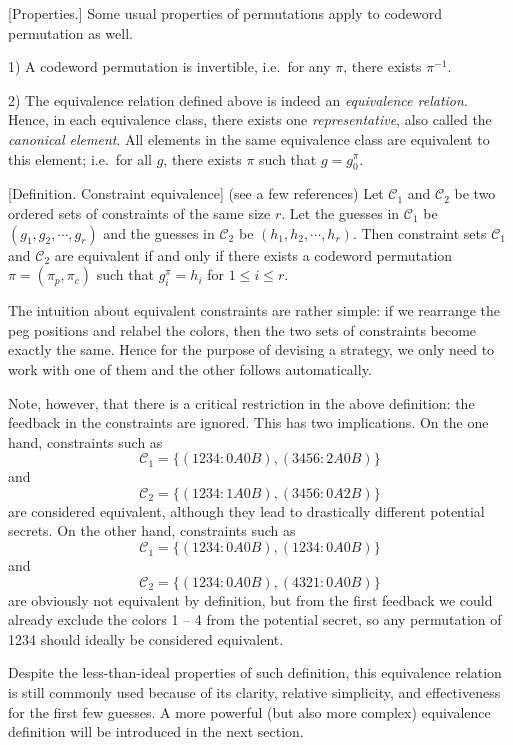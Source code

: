 [Properties.] Some usual properties of permutations apply to codeword permutation as well.

1) A codeword permutation is invertible, i.e.\ for any $\pi$, there exists $\pi^{-1}$.

2) The equivalence relation defined above is indeed an \emph{equivalence relation}. Hence, in each equivalence class, there exists one \emph{representative}, also called the \emph{canonical element}. All elements in the same equivalence class are equivalent to this element; i.e.\ for all $g$, there exists $\pi$ such that $g = g_0^\pi$.

[Definition. Constraint equivalence] (see a few references) Let $\mathcal{C}_1$ and $\mathcal{C}_2$ be two ordered sets of constraints of the same size $r$. Let the guesses in $\mathcal{C}_1$ be $(g_1,g_2,\cdots,g_r)$ and the guesses in $\mathcal{C}_2$ be $(h_1,h_2,\cdots,h_r)$. Then constraint sets $\mathcal{C}_1$ and $\mathcal{C}_2$ are equivalent if and only if there exists a codeword permutation $\pi=(\pi_p,\pi_c)$ such that
$g_i^\pi = h_i$ for $1 \le i \le r$.

The intuition about equivalent constraints are rather simple: if we rearrange the peg positions and relabel the colors, then the two sets of constraints become exactly the same. Hence for the purpose of devising a strategy, we only need to work with one of them and the other follows automatically.

Note, however, that there is a critical restriction in the above definition: the feedback in the constraints are ignored. This has two implications. On the one hand, constraints such as 
\[
\mathcal{C}_1 = \{ (1234:0A0B), (3456:2A0B) \}
\]
and
\[
\mathcal{C}_2 = \{ (1234:1A0B), (3456:0A2B) \}
\]
are considered equivalent, although they lead to drastically different potential secrets. On the other hand, constraints such as
\[
\mathcal{C}_1 = \{ (1234:0A0B), (1234:0A0B) \}
\]
and
\[
\mathcal{C}_2 = \{ (1234:0A0B), (4321:0A0B) \}
\]
are obviously not equivalent by definition, but from the first feedback  we could already exclude the colors 1 -- 4 from the potential secret, so any permutation of 1234 should ideally be considered equivalent.

Despite the less-than-ideal properties of such definition, this equivalence relation is still commonly used \cite{neuwirth81,koyama93,francis10} because of its clarity, relative simplicity, and effectiveness for the first few guesses. A more powerful (but also more complex) equivalence definition will be introduced in the next section.


